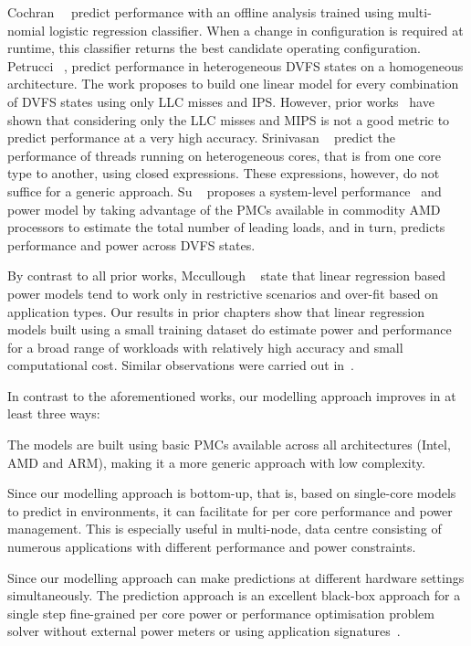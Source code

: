  Cochran~\etal~\citep{Cochran:2011:PCA:2155620.2155641} predict performance with an offline
analysis trained using multi-nomial logistic regression classifier. When a change in
configuration is required at runtime, this classifier returns the best candidate operating
configuration. Petrucci \etal~\citep{Petrucci:2012:LSE:2387869.2387876}, predict
performance in heterogeneous DVFS states on a homogeneous architecture. The work proposes
to build one linear model for every combination of DVFS states using only LLC misses and IPS.  However, prior
works~\citep{Su:2014:POP:2742155.2742200, 10.1109/TC.2012.97, 6008552} have shown that
considering only the LLC misses and MIPS is not a good metric to predict performance at a
very high accuracy. Srinivasan \etal~\citep{Srinivasan:2011:EIO:1945023.1945032}
predict the performance of threads running on heterogeneous cores, that is from one core
type to another, using closed expressions. These expressions, however, do not suffice for
a generic approach. Su \etal~\citep{Su:2014:POP:2742155.2742200} proposes a system-level
performance~\citep{Su:2014:ILL:2643634.2643656} and power model by taking advantage of the
PMCs available in commodity AMD processors to estimate the total
number of leading loads, and in turn, predicts performance and power across DVFS states.  

By contrast to all prior works, Mccullough \etal~\citep{McCullough:2011:EEM:2002181.2002193} state that
linear regression based power models tend to work only in restrictive scenarios and
over-fit based on application types. Our results in prior chapters show that linear
regression models built using a small training dataset do estimate power and performance
for a broad range of workloads with relatively high accuracy and small computational cost. 
    Similar observations were carried out in~\citep{Singh:2009:RTP:1577129.1577137,
    Lewis:2010:CAP:1924920.1924929, Isci:2003:RPM:956417.956567, 10.1109/TC.2012.97}.


In contrast to the aforementioned works, our modelling approach improves in at least three
ways: 

{\small {}} The models are built using basic PMCs available across
all architectures (Intel, AMD and ARM), making it a more generic approach with low
complexity.  

{\small {}} Since our modelling approach is bottom-up, that
is, based on single-core models to predict in \muc environments, it can facilitate for per
core performance and power management.  This is especially useful in multi-node, \muc data
centre consisting of numerous applications with different performance and power
constraints.  

{\small {}} Since our modelling approach can make predictions
at different hardware settings simultaneously.  The prediction approach is an excellent
black-box approach for a single step fine-grained per core power or performance
optimisation problem solver without external power meters or using application
signatures~\citep{Blagodurov:2010:CSM:1880018.1880019}.
